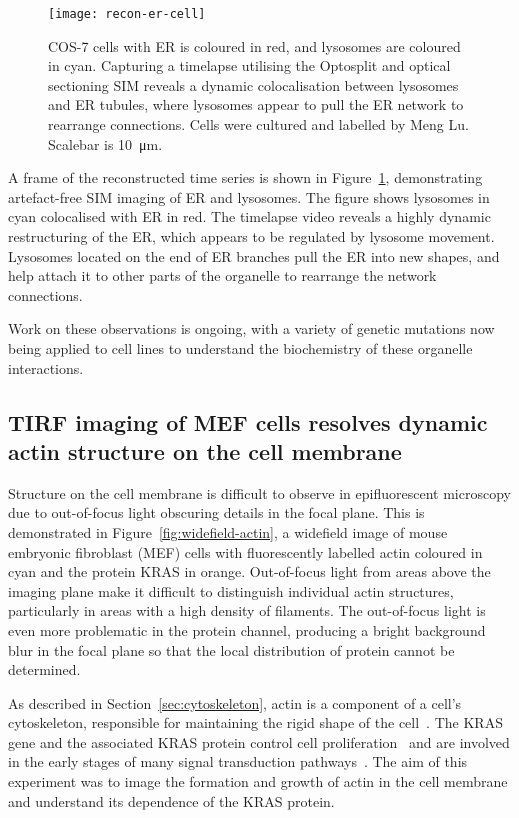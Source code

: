 \begin{figure}[tbp!]
\centering
\texttt{[image: recon-er-cell]}
\caption[LAG SIM: Fast, multi-colour imaging of ER in cells reveals co-localisation between lysosomes and ER tubules]{COS-7 cells with ER is coloured in red, and lysosomes are coloured in cyan. Capturing a timelapse utilising the Optosplit and optical sectioning SIM reveals a dynamic colocalisation between lysosomes and ER tubules, where lysosomes appear to pull the ER network to rearrange connections. Cells were cultured and labelled by Meng Lu. Scalebar is \SI{10}{\micro\metre}. }
\label{fig:recon-er-cell}
\end{figure}
\afterpage{\clearpage}

A frame of the reconstructed time series is shown in Figure~\ref{fig:recon-er-cell}, demonstrating artefact-free SIM imaging of ER and lysosomes. 
The figure shows lysosomes in cyan colocalised with ER in red. 
The timelapse video reveals a highly dynamic restructuring of the ER, which appears to be regulated by lysosome movement. 
Lysosomes located on the end of ER branches pull the ER into new shapes, and help attach it to other parts of the organelle to rearrange the network connections. 

Work on these observations is ongoing, with a variety of genetic mutations now being applied to cell lines to understand the biochemistry of these organelle interactions. 

\subsection{TIRF imaging of MEF cells resolves dynamic actin structure on the cell membrane}
Structure on the cell membrane is difficult to observe in epifluorescent microscopy due to out-of-focus light obscuring details in the focal plane. 
This is demonstrated in Figure~\ref{fig:widefield-actin}, a widefield image of mouse embryonic fibroblast (MEF) cells with fluorescently labelled actin coloured in cyan and the protein KRAS in orange. 
Out-of-focus light from areas above the imaging plane make it difficult to distinguish individual actin structures, particularly in areas with a high density of filaments.
The out-of-focus light is even more problematic in the protein channel, producing a bright background blur in the focal plane so that the local distribution of protein cannot be determined. 

As described in Section~\ref{sec:cytoskeleton}, actin is a component of a cell's cytoskeleton, responsible for maintaining the rigid shape of the cell~\cite{alberts2013essential}. 
The KRAS gene and the associated KRAS protein control cell proliferation~\cite{zimmermann2013small} and are involved in the early stages of many signal transduction pathways~\cite{downward2003targeting, kranenburg2005kras}. 
The aim of this experiment was to image the formation and growth of actin in the cell membrane and understand its dependence of the KRAS protein. 

